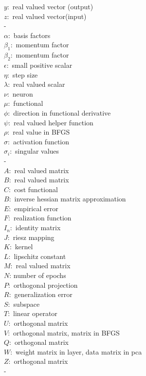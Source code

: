 \documentclass[11pt, a4paper]{article}
\begin{document}
$y:$ real valued vector (output) \\
$z:$ real valued vector(input) \\
- \\
$\alpha:$ basis factors \\
$\beta_1:$ momentum factor \\
$\beta_2:$ momentum factor \\
$\epsilon:$ small positive scalar \\
$\eta:$ step size \\
$\lambda:$ real valued scalar \\
$\nu:$ neuron \\
$\mu:$ functional \\
$\phi:$ direction in functional derivative \\
$\psi:$ real valued helper function \\
$\rho:$ real value in BFGS\\
$\sigma:$ activation function \\
$\sigma_i:$ singular values \\
- \\
$A:$ real valued matrix \\
$B:$ real valued matrix \\
$C:$ cost functional \\
$B:$ inverse hessian matrix approximation \\
$E:$ empirical error \\
$F:$ realization function \\
$I_n:$ identity matrix \\
$J:$ riesz mapping \\
$K:$ kernel \\
$L:$ lipschitz constant \\
$M:$ real valued matrix \\
$N$: number of epochs \\
$P:$ orthogonal projection \\
$R:$ generalization error \\
$S:$ subspace \\
$T:$ linear operator \\
$U:$ orthogonal matrix \\
$V:$ orthogonal matrix, matrix in BFGS \\
$Q:$ orthogonal matrix \\
$W:$ weight matrix in layer, data matrix in pca \\
$Z:$ orthogonal matrix \\
- \\
\end{document}
